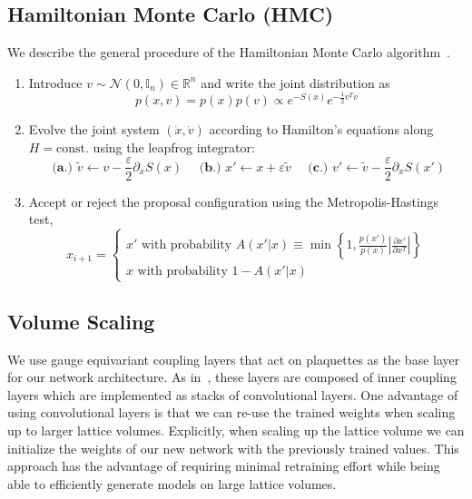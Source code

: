 \documentclass[a4paper,11pt]{article}
\begin{document}
\subsection{\label{subsec:hmc}Hamiltonian Monte Carlo (HMC)}
We describe the general procedure of the Hamiltonian Monte Carlo
algorithm~\cite{Betancourt:2017}.
\begin{enumerate}
    \item Introduce \(v \sim \mathcal{N} (0,\mathbb{I}_{n}) \in \mathbb{R}^{n}\)
        and write the joint distribution as
        \begin{equation}
            p(x, v) = p(x) p(v) \propto e^{-S(x)} e^{-\frac{1}{2} v^{T} v}
        \end{equation}
    \item Evolve the joint system \((\dot x, \dot v)\) according to
        Hamilton's equations along \(H=\text{const.}\) using the leapfrog
        integrator:
        \begin{equation}
            \textbf{ (a.)  } \tilde{v} \leftarrow v - \frac{\varepsilon}{2}\partial_{x}S(x)\quad
            \textbf{ (b.)  } x' \leftarrow x + \varepsilon \tilde{v}\quad
            \textbf{ (c.)  } v' \leftarrow \tilde{v} - \frac{\varepsilon}{2}\partial_{x} S(x')
        \end{equation}
    \item Accept or reject the proposal configuration using the
        Metropolis-Hastings test,
        \begin{equation}
            x_{i+1} = \begin{cases}
                x' \text{ with probability } 
                    A(x'|x) \equiv \min\left\{1, \frac{p(x')}{p(x)}%
                    \left|\frac{\partial x'}{\partial x^{T}}\right|\right\}\\
                x \text{ with probability } 1 - A(x'|x)
            \end{cases}
        \end{equation}
\end{enumerate}
%
\subsection{\label{subsec:volume_scaling}Volume Scaling}
%
We use gauge equivariant coupling layers that act on plaquettes as the
base layer for our network architecture.
%
As in~\cite{Albergo:2021vyo}, these layers are composed of inner coupling
layers which are implemented as stacks of convolutional layers.
%
One advantage of using convolutional layers is that we can re-use the trained
weights when scaling up to larger lattice volumes.
%
Explicitly, when scaling up the lattice volume we can initialize the weights
of our new network with the previously trained values.
%
This approach has the advantage of requiring minimal retraining effort while
being able to efficiently generate models on large lattice volumes.
%
\end{document}
